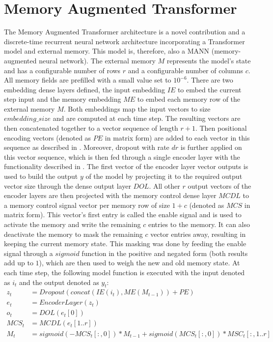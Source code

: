 \documentclass[draft,final]{vutinfth} %
\begin{document}
    \section{Memory Augmented Transformer} \label{mat}
    The Memory Augmented Transformer architecture is a novel contribution and a discrete-time recurrent neural network architecture incorporating a Transformer model and external memory.
    This model is, therefore, also a MANN (memory-augmented neural network).
    The external memory $M$ represents the model's state and has a configurable number of rows $r$ and a configurable number of columns $c$.
    All memory fields are prefilled with a small value set to $10^{-6}$.
    There are two embedding dense layers defined, the input embedding $IE$ to embed the current step input and the memory embedding $ME$ to embed each memory row of the external memory $M$.
    Both embeddings map the input vectors to size $embedding\_size$ and are computed at each time step. The resulting vectors are then concatenated together to a vector sequence of length $r+1$.
    Then positional encoding vectors (denoted as $PE$ in matrix form) are added to each vector in this sequence as described in .
    Moreover, dropout with rate $dr$ is further applied on this vector sequence, which is then fed through a single encoder layer with the functionality described in .
    The first vector of the encoder layer vector outputs is used to build the output $y$ of the model by projecting it to the required output vector size through the dense output layer $DOL$.
    All other $r$ output vectors of the encoder layers are then projected with the memory control dense layer $MCDL$ to a memory control signal vector per memory row of size $1 + c$ (denoted as $MCS$ in matrix form).
    This vector's first entry is called the enable signal and is used to activate the memory and write the remaining $c$ entries to the memory.
    It can also deactivate the memory to mask the remaining $c$ vector entries away, resulting in keeping the current memory state.
    This masking was done by feeding the enable signal through a $sigmoid$ function in the positive and negated form (both results add up to $1$), which are then used to weigh the new and old memory state.
    At each time step, the following model function is executed with the input denoted as $i_t$ and the output denoted as $y_t$:
    \begin{align}
        z_t &= Dropout(concat(IE(i_t), ME(M_{t-1})) + PE) \\
        e_t &= EncoderLayer(z_t) \\
        o_t &= DOL(e_t[0]) \\
        MCS_t &= MCDL(e_t[1..r]) \\
        M_t &= sigmoid(-MCS_t[:,0]) * M_{t-1} + sigmoid(MCS_t[:,0]) * MSC_t[:,1..r]
    \end{align}
\end{document}

